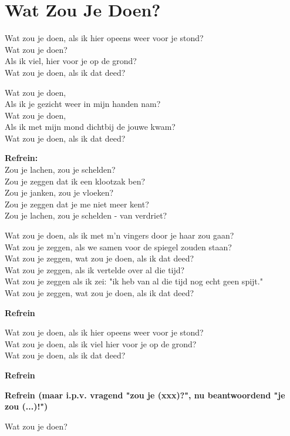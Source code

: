 \section{Wat Zou Je Doen?}
Wat zou je doen, als ik hier opeens weer voor je stond?\\
Wat zou je doen?\\
Als ik viel, hier voor je op de grond?\\
Wat zou je doen, als ik dat deed?

Wat zou je doen,\\
Als ik je gezicht weer in mijn handen nam?\\
Wat zou je doen,\\
Als ik met mijn mond dichtbij de jouwe kwam?\\
Wat zou je doen, als ik dat deed?

\textbf{Refrein:}\\
Zou je lachen, zou je schelden?\\
Zou je zeggen dat ik een klootzak ben?\\
Zou je janken, zou je vloeken?\\
Zou je zeggen dat je me niet meer kent?\\
Zou je lachen, zou je schelden - van verdriet?

Wat zou je doen, als ik met m'n vingers door je haar zou gaan?\\
Wat zou je zeggen, als we samen voor de spiegel zouden staan?\\
Wat zou je zeggen, wat zou je doen, als ik dat deed?\\
Wat zou je zeggen, als ik vertelde over al die tijd?\\
Wat zou je zeggen als ik zei: "ik heb van al die tijd nog echt geen spijt."\\
Wat zou je zeggen, wat zou je doen, als ik dat deed?

\textbf{Refrein}

Wat zou je doen, als ik hier opeens weer voor je stond?\\
Wat zou je doen, als ik viel hier voor je op de grond?\\
Wat zou je doen, als ik dat deed?

\textbf{Refrein}

\textbf{Refrein (maar i.p.v. vragend "zou je (xxx)?", nu beantwoordend "je zou (...)!")}

Wat zou je doen?
